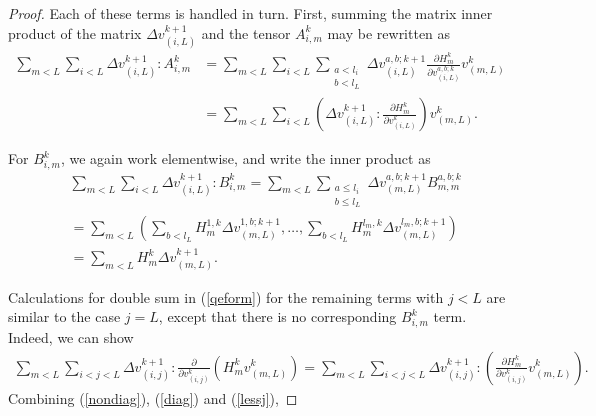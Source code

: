 \documentclass{jcmlatex}
\begin{document}
\begin{proof}
Each of these terms is handled in turn.  First, summing the matrix inner product of the matrix $\Delta v_{(i,L)}^{k+1}$ and the tensor $A_{i,m}^k$  may be rewritten as
\begin{align}
\sum_{m<L}\sum_{i< L} \Delta v_{(i,L)}^{k+1}:A_{i,m}^k
  &= \sum_{m<L} \sum_{i<L} \sum_{\substack{a<l_i\\b<l_L}}\Delta v_{(i,L)}^{a,b;k+1}\frac{\partial
 H_m^{k} }{\partial v_{(i,L)}^{a,b;k}}v_{(m,L)}^k\\
&= \sum_{m<L} \sum_{i< L} \left(\Delta v_{(i,L)}^{k+1}:\frac{\partial H_m^k }{\partial
v_{(i,L)}^k}\right)v^k_{(m,L)}.
 \label{nondiag}
\end{align}

For $B_{i,m}^k$, we again work elementwise, and write the inner product as
\begin{align}
&\sum_{m<L}\sum_{i< L} \Delta v_{(i,L)}^{k+1}:B_{i,m}^k
  = \sum_{m<L} \sum_{\substack{a\le l_i\\b\le l_L}}\Delta v_{(m,L)}^{a,b;k+1}B_{m,m}^{a,b;k}\\
     &=\sum_{m<L}\left(\sum_{b<l_L}H_m^{1,k}\Delta v_{(m,L)}^{1,b;k+1}, \dots,
\sum_{b<l_L}H_m^{l_m,k}\Delta v_{(m,L)}^{l_m,b;k+1}\right)\\&=\sum_{m<L}H_m^k\Delta
v_{(m,L)}^{k+1}.\label{diag}
\end{align}

Calculations for double sum in (\ref{qeform}) for the remaining terms with $j<L$ are similar to the case $j = L$, except that there is
no corresponding $B_{i,m}^k$ term. Indeed, we can show
\begin{align}
\sum_{m<L}\sum_{i<j< L} \Delta v_{(i,j)}^{k+1}:
\frac{\partial }{\partial v_{(i,j)}^k}\left(H_m^{k}v_{(m,L)}^k \right)
 = \sum_{m<L}\sum_{i<j< L}\Delta v_{(i,j)}^{k+1}:\left(\frac{\partial H_m^k}{\partial
v_{(i,j)}^k}v_{(m,L)}^k\right). \label{lessj} \end{align}
Combining (\ref{nondiag}), (\ref{diag}) and (\ref{lessj}),


\end{proof}
\end{document}
